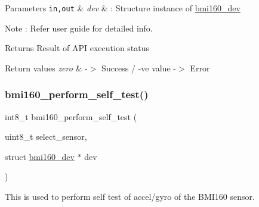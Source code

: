 \begin{DoxyParams}[1]{Parameters}
\mbox{\tt in,out}  & {\em dev} & \+: Structure instance of \hyperlink{structbmi160__dev}{bmi160\+\_\+dev} \\
\hline
\end{DoxyParams}
\begin{DoxyNote}{Note}
\+: Refer user guide for detailed info.
\end{DoxyNote}
\begin{DoxyReturn}{Returns}
Result of A\+PI execution status 
\end{DoxyReturn}

\begin{DoxyRetVals}{Return values}
{\em zero} & -\/$>$ Success / -\/ve value -\/$>$ Error \\
\hline
\end{DoxyRetVals}
\mbox{\label{group__bmi160_ga6f83dc85a8173886ffe58e381fd9e0b8}} 
\subsubsection{\texorpdfstring{bmi160\+\_\+perform\+\_\+self\+\_\+test()}{bmi160\_perform\_self\_test()}}
{\footnotesize\ttfamily int8\+\_\+t bmi160\+\_\+perform\+\_\+self\+\_\+test (\begin{DoxyParamCaption}\item[{uint8\+\_\+t}]{select\+\_\+sensor,  }\item[{struct \hyperlink{structbmi160__dev}{bmi160\+\_\+dev} $\ast$}]{dev }\end{DoxyParamCaption})}



This is used to perform self test of accel/gyro of the B\+M\+I160 sensor. 


